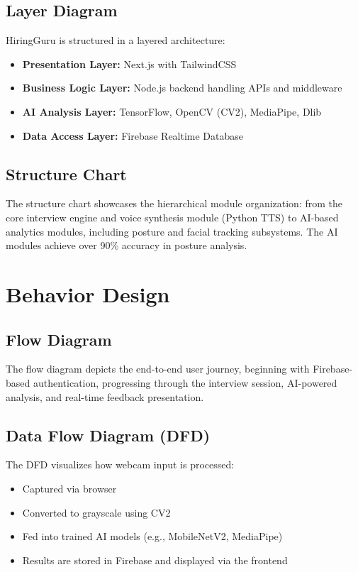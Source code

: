 \subsection{Layer Diagram}
HiringGuru is structured in a layered architecture:
\begin{itemize}
  \item \textbf{Presentation Layer:} Next.js with TailwindCSS
  \item \textbf{Business Logic Layer:} Node.js backend handling APIs and middleware
  \item \textbf{AI Analysis Layer:} TensorFlow, OpenCV (CV2), MediaPipe, Dlib
  \item \textbf{Data Access Layer:} Firebase Realtime Database
\end{itemize}

\subsection{Structure Chart}
The structure chart showcases the hierarchical module organization: from the core interview engine and voice synthesis module (Python TTS) to AI-based analytics modules, including posture and facial tracking subsystems. The AI modules achieve over 90\% accuracy in posture analysis.

\section{Behavior Design}

\subsection{Flow Diagram}
The flow diagram depicts the end-to-end user journey, beginning with Firebase-based authentication, progressing through the interview session, AI-powered analysis, and real-time feedback presentation.

\subsection{Data Flow Diagram (DFD)}
The DFD visualizes how webcam input is processed:
\begin{itemize}
  \item Captured via browser
  \item Converted to grayscale using CV2
  \item Fed into trained AI models (e.g., MobileNetV2, MediaPipe)
  \item Results are stored in Firebase and displayed via the frontend
\end{itemize}

